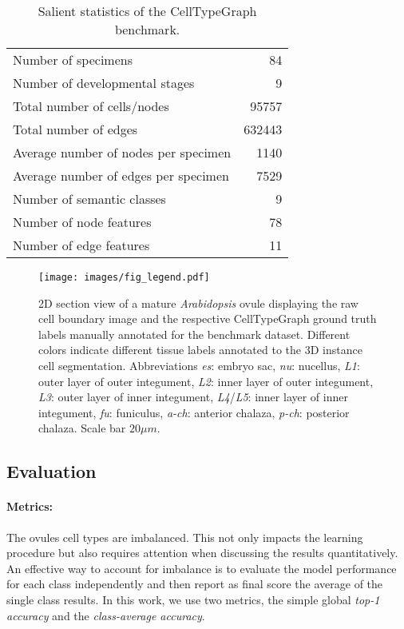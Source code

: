 \documentclass[10pt,twocolumn,letterpaper]{article}
\begin{document}
\begin{table}
  \centering
  \begin{tabular}{@{}lr@{}}
    \toprule
    Number of specimens & 84 \\
    Number of developmental stages & 9 \\
    Total number of cells/nodes & 95757\\
    Total number of edges & 632443 \\
    Average number of nodes per specimen & 1140 \\
    Average number of edges per specimen & 7529 \\
    Number of semantic classes & 9 \\
    Number of node features & 78\\
    Number of edge features & 11\\
    \bottomrule
  \end{tabular}
  \caption{Salient statistics of the CellTypeGraph benchmark.}
  \label{tab:summary}
\end{table}

\begin{figure}
    \centering
    \texttt{[image: images/fig\_legend.pdf]}
  \caption{2D section view of a mature \textit{Arabidopsis} ovule displaying the raw cell boundary image and the respective CellTypeGraph ground truth labels manually annotated for the benchmark dataset. Different colors indicate different tissue labels annotated to the 3D instance cell segmentation. Abbreviations \textit{es}: embryo sac, \textit{nu}: nucellus, \textit{L1}: outer layer of outer integument, \textit{L2}: inner layer of outer integument, \textit{L3}: outer layer of inner integument, \textit{L4}/\textit{L5}: inner layer of inner integument, \textit{fu}: funiculus, \textit{a-ch}: anterior chalaza, \textit{p-ch}: posterior chalaza. Scale bar $20 \mu m$.}
  \label{fig:labels-legend}
\end{figure}

\subsection{Evaluation}
\label{subsec:evaluation}
\paragraph{Metrics:} The ovules cell types are imbalanced. This not only impacts the learning procedure but also requires attention when discussing the results quantitatively.
An effective way to account for imbalance is to evaluate the model performance for each class independently and then report as final score the average of the single class results.
In this work, we use two metrics, the simple global \textit{top-1 accuracy} and the \textit{class-average accuracy}.
\end{document}
